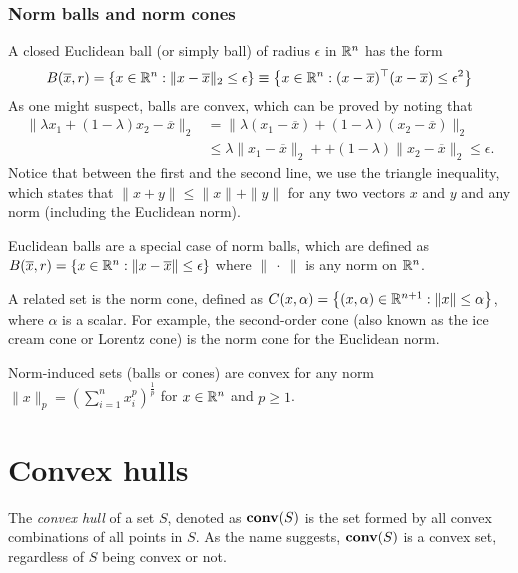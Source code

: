 \subsubsection{Norm balls and norm cones}

A closed Euclidean ball (or simply ball) of radius $\epsilon$ in $\mathbb{R}^n$ has the form
%
\begin{equation*}
	B(\overline{x}, r) = \left\{ x \in \mathbb{R}^n : \| x - \overline{x}\|_2 \le \epsilon \right \} \equiv \left\{ x \in \mathbb{R}^n : (x - \overline{x})^\top (x - \overline{x}) \le \epsilon^2 \right \}
\end{equation*}
%
As one might suspect, balls are convex, which can be proved by noting that
%
\begin{align*}
	\|\lambda x_1 + (1 - \lambda) x_2 - \overline{x}\|_2  & = \|\lambda (x_1 - \overline{x}) + (1 - \lambda) (x_2 - \overline{x})\|_2 \\
	& \le \lambda \|x_1 - \overline{x}\|_2 + + (1 - \lambda) \|x_2 - \overline{x}\|_2 \le \epsilon.
\end{align*}
%
Notice that between the first and the second line, we use the triangle inequality, which states that $\|x + y\| \le \|x\| + \|y\|$ for any two vectors $x$ and $y$ and any norm (including the Euclidean norm). 

Euclidean balls are a special case of norm balls, which are defined as $B(\overline{x}, r) = \left\{ x \in \mathbb{R}^n : \| x - \overline{x}\| \le \epsilon \right \}$ where $\|\ \cdot \ \|$ is any norm on $\mathbb{R}^n$. 

A related set is the norm cone, defined as $C(x, \alpha) = \left\{ (x,\alpha) \in \mathbb{R}^{n+1} : \|x\| \le \alpha \right \}$, where $\alpha$ is a scalar. For example, the second-order cone (also known as the ice cream cone or Lorentz cone) is the norm cone for the Euclidean norm.

\begin{remark} 
	Norm-induced sets (balls or cones) are convex for any norm $\|x\|_p = \left(\sum_{i=1}^n x_i^p\right)^{\frac{1}{p}}$ for $x \in \mathbb{R}^n$ and $p \geq 1$.
\end{remark}


\section{Convex hulls} 

The \emph{convex hull} of a set $S$, denoted as $\mathop{\bf conv}(S)$ is the set formed by all convex combinations of all points in $S$. As the name suggests, $\mathop{\bf conv}(S)$ is a convex set, regardless of $S$ being convex or not. 

